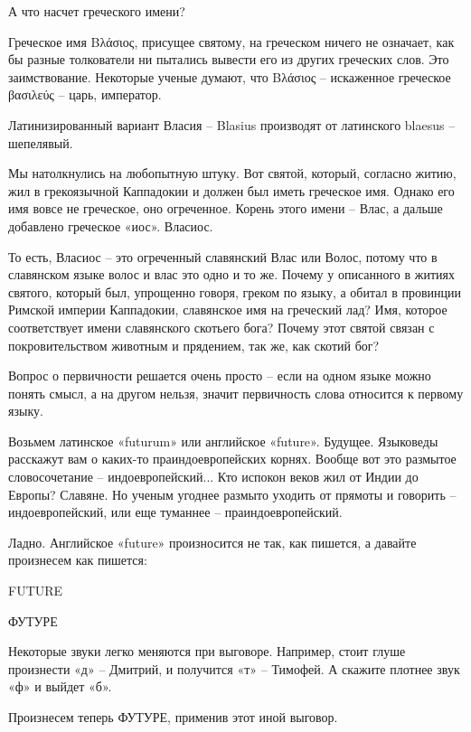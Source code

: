    А что насчет греческого имени?

   Греческое имя Βλάσιος, присущее святому, на греческом ничего не означает, как бы разные толкователи ни пытались вывести его из других греческих слов. Это заимствование. Некоторые ученые думают, что Βλάσιος – искаженное греческое βασιλεύς – царь, император.

 Латинизированный вариант Власия –  Blasius производят от латинского blaesus – шепелявый.

   Мы натолкнулись на любопытную штуку. Вот святой, который, согласно житию, жил в грекоязычной Каппадокии и должен был иметь греческое имя. Однако его имя вовсе не греческое, оно огреченное. Корень этого имени – Влас, а дальше добавлено греческое «иос». Власиос.

   То есть, Власиос – это огреченный славянский Влас или Волос, потому что в славянском языке волос и влас это одно и то же. Почему у описанного в житиях святого, который был, упрощенно говоря, греком по языку, а обитал в провинции Римской империи Каппадокии, славянское имя на греческий лад? Имя, которое соответствует имени славянского скотьего бога? Почему этот святой связан с покровительством животным и прядением, так же, как скотий бог?

   Вопрос о первичности решается очень просто – если на одном языке можно понять смысл, а на другом нельзя, значит первичность слова относится к первому языку.

   Возьмем латинское «futurum» или английское «future». Будущее. Языковеды расскажут вам о каких-то праиндоевропейских корнях. Вообще вот это размытое словосочетание – индоевропейский... Кто испокон веков жил от Индии до Европы? Славяне. Но ученым угоднее  размыто уходить от прямоты и говорить – индоевропейский, или еще туманнее – праиндоевропейский.

   Ладно. Английское «future» произносится не так, как пишется, а давайте произнесем как пишется:\newline

FUTURE\newline

ФУТУРЕ\newline

   Некоторые звуки легко меняются при выговоре. Например, стоит глуше произнести «д» – Дмитрий, и получится «т» – Тимофей. А скажите плотнее звук «ф» и выйдет «б».

Произнесем теперь ФУТУРЕ, применив этот иной выговор.\newline

